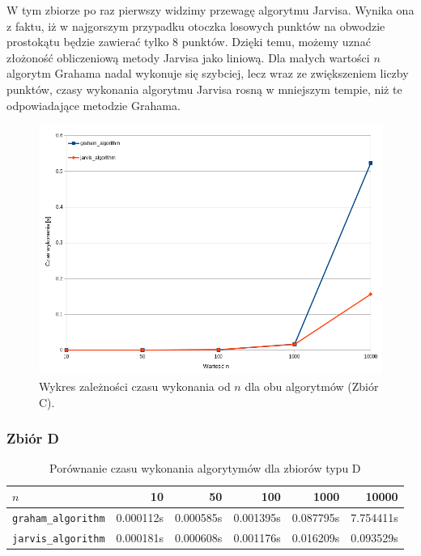 \documentclass[11pt,a4paper]{article}
\begin{document}
W tym zbiorze po raz pierwszy widzimy przewagę algorytmu Jarvisa.
Wynika ona z faktu, iż w najgorszym przypadku otoczka losowych punktów
na obwodzie prostokątu będzie zawierać tylko 8 punktów. Dzięki temu,
możemy uznać złożoność obliczeniową metody Jarvisa jako liniową.
Dla małych wartości $n$ algorytm Grahama nadal wykonuje się szybciej,
lecz wraz ze zwiększeniem liczby punktów, czasy wykonania algorytmu Jarvisa
rosną w mniejszym tempie, niż te odpowiadające metodzie Grahama.

\begin{figure}[H]
    \centering
    \includegraphics[scale=0.6]{res/wykres_c.png}
    \caption{Wykres zależności czasu wykonania 
    od $n$ dla obu algorytmów (Zbiór C).}
\end{figure}

\subsubsection{Zbiór D}
\begin{table}[H]
    \centering
    \begin{tabular}{|l|r|r|r|r|r|}
    \hline
        $n$ & 10 & 50 & 100 & 1000 & 10000 \\ \hline
        \verb|graham_algorithm| & 0.000112s & 0.000585s & 0.001395s & 0.087795s & 7.754411s \\ \hline
        \verb|jarvis_algorithm| & 0.000181s & 0.000608s & 0.001176s & 0.016209s & 0.093529s \\ \hline
    \end{tabular}
    \caption{Porównanie czasu wykonania algorytymów dla zbiorów typu D}
\end{table}
\end{document}
